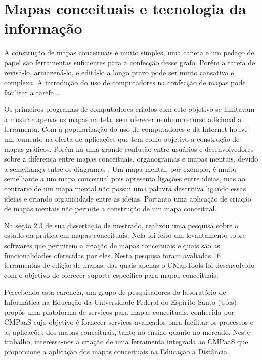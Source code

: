 \documentclass[
	12pt,				%
	openright,			%
	oneside,			%
	a4paper,			%
	english,			%
	french,				%
	spanish,			%
	brazil				%
	]{abntex2}
\begin{document}
\section{Mapas conceituais e tecnologia da informação}

A construção de mapas conceituais é muito simples, uma caneta e um pedaço de papel são ferramentas suficientes para a confecção desse grafo. Porém a tarefa de revisá-lo, armazená-lo, e editá-lo a longo prazo  pode ser muito cansativa e complexa. A introdução do uso de computadores na confecção de mapas pode facilitar a tarefa \cite{Novak2006}.

Os primeiros programas de computadores criados com este objetivo se limitavam a mostrar apenas os mapas na tela, sem oferecer nenhum recurso adicional a ferramenta. Com a popularização do uso de computadores e da Internet houve um aumento na oferta de aplicações que tem como objetivo a construção de mapas gráficos. Porém há uma grande confusão entre usuários e desenvolvedores sobre a diferença entre mapas conceituais, organogramas e mapas mentais, devido a semelhança entre os diagramas \cite{Perin2014}. Um mapa mental, por exemplo, é muito semelhante a um mapa conceitual pois apresenta ligações entre ideias, mas ao contrario de um mapa mental não possui uma palavra descritiva ligando essas ideias e criando organicidade entre as ideias. Portanto uma aplicação de criação de mapas mentais não permite a construção de um mapa conceitual. 

Na seção 2.3 de sua dissertação de mestrado,  realizou uma pesquisa sobre o estado da prática em mapas conceituais. Nela foi feito um levantamento sobre softwares que permitem a criação de mapas conceituais e quais são as funcionalidades oferecidas por eles. Nesta pesquisa foram avaliadas 16 ferramentas de edição de mapas, das quais apenas o CMapTools foi desenvolvido com o objetivo de oferecer suporte específico para mapas conceituais.

Percebendo esta carência, um grupo de pesquisadores do laboratório de Informática na Educação da Universidade Federal do Espírito Santo (Ufes) propôs uma plataforma de serviços para mapas conceituais, conhecida por CMPaaS \cite{Perin2016} cujo objetivo é fornecer serviços avançados para facilitar os processos e as aplicações dos mapas conceituais, tanto no ensino quanto no mercado. Neste trabalho, interessa-nos a criação de uma ferramenta integrada ao CMPaaS que proporcione a aplicação dos mapas conceituais na Educação a Distância. 
  
\end{document}
